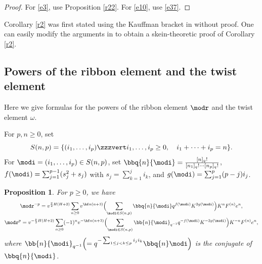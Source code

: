 \documentclass{amsart}
\numberwithin{equation}{section}
\numberwithin{figure}{section}
\theoremstyle{plain}
\newtheorem{proposition}[theorem]{Proposition}
\theoremstyle{definition}
\theoremstyle{remark}
\begin{document}
\begin{proof}
  For \eqref{e3}, use Proposition \ref{r22}.  For \eqref{e10}, use
  \eqref{e37}.
\end{proof}

Corollary \ref{r2} was first stated using the Kauffman bracket in
\cite{H:iias2000} without proof.  One can easily modify the arguments
in \cite{Masbaum} to obtain a skein-theoretic proof of Corollary
\ref{r2}.

\subsection{Powers of the ribbon element and the twist element}
\label{sec:powers-ribb-elem}
Here we give formulas for the powers of the ribbon element $\modr $ and
the twist element $\omega $.

For $p,n\ge 0$, set
\begin{equation*}
  S(n,p) = \{(i_1,\ldots,i_p)\zzzvert i_1,\ldots,i_p\ge 0,\quad i_1+\cdots+i_p=n\}.
\end{equation*}
For $\modi =(i_1,\ldots,i_p)\in S(n,p)$, set
$\bbq{n}{\modi }=\frac{[n]_q!}{[n_1]_q!\cdots[n_p]_q!}$,
$f(\modi )=\sum_{j=1}^{p-1}(s_j^2+s_j)$ with $s_j=\sum_{k=1}^ji_k$, and
$g(\modi )=\sum_{j=1}^p(p-j)i_j$.

\begin{proposition}
  \label{r8}
  For $p\ge 0$, we have
  \begin{gather*}
    \modr ^{-p}
    = v^{\frac p2 H(H+2)}\sum_{n\ge 0}v^{\hf n(n+3)}
    \Bigl(\sum_{\modi \in S(n,p)}\bbq{n}{\modi }q^{f(\modi )}K^{2g(\modi )}\Bigr)
    K^nF^{(n)}e^n,\\
    \modr ^p
    = v^{-\frac p2 H(H+2)}
    \sum_{n\ge 0}(-1)^nv^{-\hf n(n+3)}
    \Bigl(\sum_{\modi \in S(n,p)}\bb{n}{\modi }_{q^{-1}}q^{-f(\modi )}K^{-2g(\modi )}\Bigr)
    K^{-n}F^{(n)}e^n,
  \end{gather*}
  where
  $\bb{n}{\modi }_{q^{-1}}\Bigl(=q^{-\sum_{1\le j<k\le p}i_ji_k}\bbq{n}\modi \Bigr)$
  is the conjugate of $\bbq{n}{\modi }$.
\end{proposition}
\end{document}
